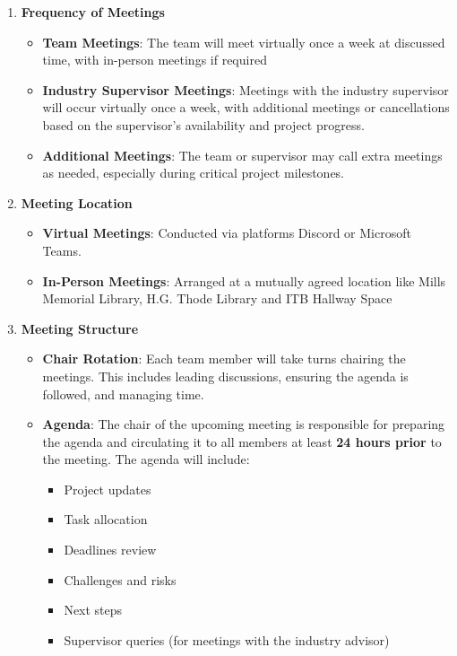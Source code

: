 \documentclass{article}
\begin{document}
\begin{enumerate}[label=\textbf{\arabic*}]
    \item \textbf{Frequency of Meetings}
    \begin{itemize}
        \item \textbf{Team Meetings}: The team will meet virtually once a week
        at discussed time, with in-person meetings if required
        \item \textbf{Industry Supervisor Meetings}: Meetings with the industry
        supervisor will occur virtually once a week, with additional meetings or
        cancellations based on the supervisor's availability and project
        progress.
        \item \textbf{Additional Meetings}: The team or supervisor may call
        extra meetings as needed, especially during critical project milestones.
    \end{itemize}
    
    \item \textbf{Meeting Location}
    \begin{itemize}
        \item \textbf{Virtual Meetings}: Conducted via platforms Discord or
        Microsoft Teams.
        \item \textbf{In-Person Meetings}: Arranged at a mutually agreed
        location like Mills Memorial Library, H.G. Thode Library and ITB Hallway
        Space 
    \end{itemize}

    \item \textbf{Meeting Structure}
    \begin{itemize}
    \item \textbf{Chair Rotation}: Each team member will take turns chairing the
    meetings. This includes leading discussions, ensuring the agenda is
    followed, and managing time.
    \item \textbf{Agenda}: The chair of the upcoming meeting is responsible for
    preparing the agenda and circulating it to all members at least \textbf{24
    hours prior} to the meeting. The agenda will include:
    \begin{itemize}
        \item Project updates
        \item Task allocation
        \item Deadlines review
        \item Challenges and risks
        \item Next steps
        \item Supervisor queries (for meetings with the industry advisor)
    \end{itemize}
    \end{itemize}


\end{enumerate}
\end{document}
